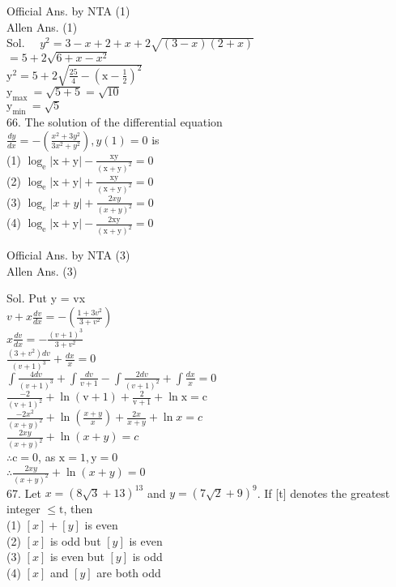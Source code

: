 \documentclass[10pt]{article}
\begin{document}
Official Ans. by NTA (1)\\
Allen Ans. (1)\\
Sol. \(\quad y^{2}=3-x+2+x+2 \sqrt{(3-x)(2+x)}\)\\
\(=5+2 \sqrt{6+x-x^{2}}\)\\
\(\mathrm{y}^{2}=5+2 \sqrt{\frac{25}{4}-\left(\mathrm{x}-\frac{1}{2}\right)^{2}}\)\\
\(\mathrm{y}_{\text {max }}=\sqrt{5+5}=\sqrt{10}\)\\
\(\mathrm{y}_{\text {min }}=\sqrt{5}\)\\
66. The solution of the differential equation\\
\(\frac{d y}{d x}=-\left(\frac{x^{2}+3 y^{2}}{3 x^{2}+y^{2}}\right), y(1)=0\) is\\
(1) \(\log _{\mathrm{e}}|\mathrm{x}+\mathrm{y}|-\frac{\mathrm{xy}}{(\mathrm{x}+\mathrm{y})^{2}}=0\)\\
(2) \(\log _{\mathrm{e}}|\mathrm{x}+\mathrm{y}|+\frac{\mathrm{xy}}{(\mathrm{x}+\mathrm{y})^{2}}=0\)\\
(3) \(\log _{e}|x+y|+\frac{2 x y}{(x+y)^{2}}=0\)\\
(4) \(\log _{\mathrm{e}}|\mathrm{x}+\mathrm{y}|-\frac{2 \mathrm{xy}}{(\mathrm{x}+\mathrm{y})^{2}}=0\)

Official Ans. by NTA (3)\\
Allen Ans. (3)

Sol. Put y = vx\\
\(v+x \frac{d v}{d x}=-\left(\frac{1+3 v^{2}}{3+v^{2}}\right)\)\\
\(x \frac{d v}{d x}=-\frac{(v+1)^{3}}{3+v^{2}}\)\\
\(\frac{\left(3+v^{2}\right) d v}{(v+1)^{3}}+\frac{d x}{x}=0\)\\
\(\int \frac{4 d v}{(v+1)^{3}}+\int \frac{d v}{v+1}-\int \frac{2 d v}{(v+1)^{2}}+\int \frac{d x}{x}=0\)\\
\(\frac{-2}{(\mathrm{v}+1)^{2}}+\ln (\mathrm{v}+1)+\frac{2}{\mathrm{v}+1}+\ln \mathrm{x}=\mathrm{c}\)\\
\(\frac{-2 x^{2}}{(x+y)^{2}}+\ln \left(\frac{x+y}{x}\right)+\frac{2 x}{x+y}+\ln x=c\)\\
\(\frac{2 x y}{(x+y)^{2}}+\ln (x+y)=c\)\\
\(\therefore \mathrm{c}=0\), as \(\mathrm{x}=1, \mathrm{y}=0\)\\
\(\therefore \frac{2 x y}{(x+y)^{2}}+\ln (x+y)=0\)\\
67. Let \(x=(8 \sqrt{3}+13)^{13}\) and \(y=(7 \sqrt{2}+9)^{9}\). If [t] denotes the greatest integer \(\leq \mathrm{t}\), then\\
(1) \([x]+[y]\) is even\\
(2) \([x]\) is odd but \([y]\) is even\\
(3) \([x]\) is even but \([y]\) is odd\\
(4) \([x]\) and \([y]\) are both odd
\end{document}
